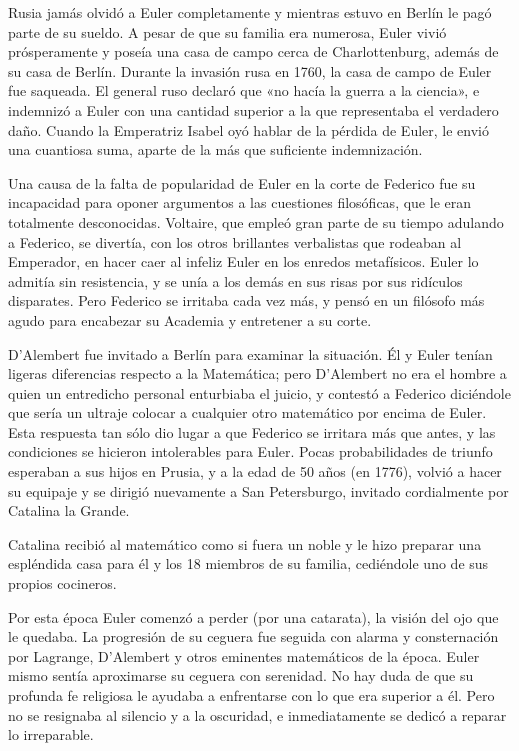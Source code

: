 \documentclass[a4paper, 12pt]{article}
\begin{document}
Rusia jamás olvidó a Euler completamente y mientras estuvo en Berlín le pagó parte de su sueldo. A pesar de que su familia era numerosa, Euler vivió prósperamente y poseía una casa de campo cerca de Charlottenburg, además de su casa de Berlín. Durante la invasión rusa en 1760, la casa de campo de Euler fue saqueada. El general ruso declaró que «no hacía la guerra a la ciencia», e indemnizó a Euler con una cantidad superior a la que representaba el verdadero daño. Cuando la Emperatriz Isabel oyó hablar de la pérdida de Euler, le envió una cuantiosa suma, aparte de la más que suficiente indemnización.

Una causa de la falta de popularidad de Euler en la corte de Federico fue su incapacidad para oponer argumentos a las cuestiones filosóficas, que le eran totalmente desconocidas. Voltaire, que empleó gran parte de su tiempo adulando a Federico, se divertía, con los otros brillantes verbalistas que rodeaban al Emperador, en hacer caer al infeliz Euler en los enredos metafísicos. Euler lo admitía sin resistencia, y se unía a los demás en sus risas por sus ridículos disparates. Pero Federico se irritaba cada vez más, y pensó en un filósofo más agudo para encabezar su Academia y entretener a su corte.

D'Alembert fue invitado a Berlín para examinar la situación. Él y Euler tenían ligeras diferencias respecto a la Matemática; pero D'Alembert no era el hombre a quien un entredicho personal enturbiaba el juicio, y contestó a Federico diciéndole que sería un ultraje colocar a cualquier otro matemático por encima de Euler. Esta respuesta tan sólo dio lugar a que Federico se irritara más que antes, y las condiciones se hicieron intolerables para Euler. Pocas probabilidades de triunfo esperaban a sus hijos en Prusia, y a la edad de 50 años (en 1776), volvió a hacer su equipaje y se dirigió nuevamente a San Petersburgo, invitado cordialmente por Catalina la Grande.

Catalina recibió al matemático como si fuera un noble y le hizo preparar una espléndida casa  para él y los 18 miembros de su familia, cediéndole uno de sus propios cocineros.

Por esta época Euler comenzó a perder (por una catarata), la visión del ojo que le quedaba. La progresión de su ceguera fue seguida con alarma y consternación por Lagrange, D'Alembert y otros eminentes matemáticos de la época. Euler mismo sentía aproximarse su ceguera con serenidad. No hay duda de que su profunda fe religiosa le ayudaba a enfrentarse con lo que era superior a él. Pero no se resignaba al silencio y a la oscuridad, e inmediatamente se dedicó a reparar lo irreparable.
\end{document}
